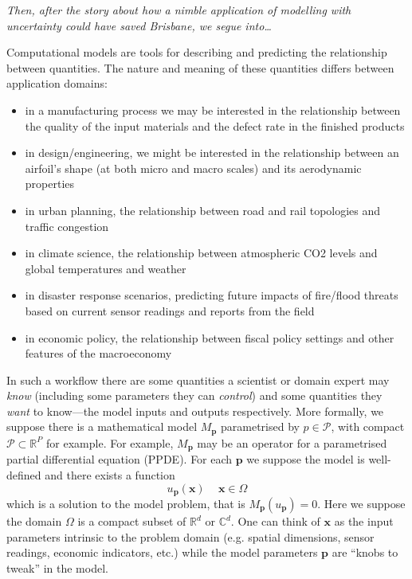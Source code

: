 \documentclass[a4paper,fontsize=12pt]{scrartcl}
\begin{document}
\emph{Then, after the story about how a nimble application of
  modelling with uncertainty could have saved Brisbane, we segue
  into\ldots}

Computational models are tools for describing and predicting the
relationship between quantities. The nature and meaning of these
quantities differs between application domains:
\begin{itemize}
\item in a manufacturing process we may be interested in the
  relationship between the quality of the input materials and the
  defect rate in the finished products
\item in design/engineering, we might be interested in the
  relationship between an airfoil's shape (at both micro and macro
  scales) and its aerodynamic properties
\item in urban planning, the relationship between road and rail
  topologies and traffic congestion
\item in climate science, the relationship between atmospheric CO2
  levels and global temperatures and weather
\item in disaster response scenarios, predicting future impacts of
  fire/flood threats based on current sensor readings and reports from
  the field
\item in economic policy, the relationship between fiscal policy
  settings and other features of the macroeconomy
\end{itemize}
In such a workflow there are some quantities a scientist or domain
expert may \emph{know} (including some parameters they can
\emph{control}) and some quantities they \emph{want} to know---the
model inputs and outputs respectively. More formally, we suppose there is a mathematical model $M_{\mathbf{p}}$ parametrised by $p\in\mathcal{P}$, with compact $\mathcal{P}\subset\mathbb{R}^{P}$ for example.
For example, $M_{\mathbf{p}}$ may be an operator for a parametrised partial differential equation (PPDE).
For each $\mathbf{p}$ we suppose the model is well-defined and there exists a function 
\begin{equation}
  \label{eq:1}
  u_{\mathbf{p}}(\mathbf{x})\, \quad \mathbf{x}\in\Omega
\end{equation}
which is a solution to the model problem, that is $M_{\mathbf{p}}(u_{\mathbf{p}})=0$.
Here we suppose the domain $\Omega$ is a compact subset of $\mathbb{R}^{d}$ or $\mathbb{C}^{d}$. 
One can think of $\mathbf{x}$ as the 
input parameters intrinsic to the problem %
domain (e.g. spatial dimensions,
sensor readings, economic indicators, etc.) while the model parameters $\mathbf{p}$
are ``knobs to tweak'' in the model.
\end{document}
